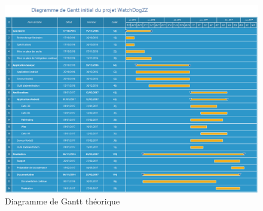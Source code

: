\begin{landscape}
    \begin{figure}[h]
        \centering
        \includegraphics[height=\textwidth]{../gantt_initial.png}
        \caption{Diagramme de Gantt théorique}
        \label{ganttinit}
    \end{figure}
\end{landscape}
